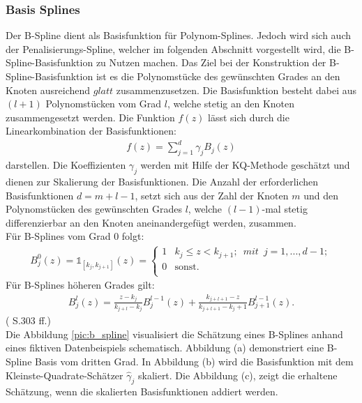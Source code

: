 \documentclass[12pt]{scrreprt}
\begin{document}
\subsubsection{Basis Splines}
Der B-Spline dient als Basisfunktion für Polynom-Splines. Jedoch wird sich auch der Penalisierungs-Spline, welcher im folgenden Abschnitt vorgestellt wird, die B-Spline-Basisfunktion zu Nutzen machen. Das Ziel bei der Konstruktion der B-Spline-Basisfunktion ist es die Polynomstücke des gewünschten Grades an den Knoten ausreichend $glatt$ zusammenzusetzen. Die Basisfunktion besteht dabei aus $(l+1)$ Polynomstücken vom Grad $l$, welche stetig an den Knoten zusammengesetzt werden. Die Funktion $f(z)$ lässt sich durch die Linearkombination der Basisfunktionen:
\begin{align}
f(z)=\sum_{j=1}^d\gamma_{j}B_{j}(z)
\end{align}
darstellen. Die Koeffizienten  $\gamma_{j}$ werden mit Hilfe der KQ-Methode geschätzt und dienen zur Skalierung der Basisfunktionen. Die Anzahl der erforderlichen Basisfunktionen $d = m+l-1$, setzt sich aus der Zahl der Knoten $m$ und den Polynomstücken des gewünschten Grades $l$, welche $(l-1)$-mal stetig differenzierbar an den Knoten aneinandergefügt werden, zusammen.  \\
Für B-Splines vom Grad 0 folgt:
\begin{align}
B_{j}^0(z)= \mathbb{1}_{[k_{j},k_{j+1}]}(z)= 
\begin{cases}
1 & k_{j} \leq z<k_{j+1};\enspace mit\enspace j=1,...,d-1; \\
0 & \text{sonst.} \\
\end{cases}
\end{align}
Für B-Splines höheren Grades gilt:
\begin{align}
B_{j}^l(z)= \frac{z-k_{j}}{k_{j+l}-k_{j}}B_{j}^{l-1}(z)+
\frac{k_{j+l+1}-z}{k_{j+l+1}-k_j+1}B_{j+1}^{l-1}(z).
\end{align}
(\cite{fahrmeir2007regression} S.303 ff.) \\
Die Abbildung \ref{pic:b_spline} visualisiert die Schätzung eines B-Splines anhand eines fiktiven Datenbeispiels schematisch. Abbildung (a) demonstriert eine B-Spline Basis vom dritten Grad. In Abbildung (b) wird die Basisfunktion mit dem Kleinste-Quadrate-Schätzer $\hat\gamma_{j}$ skaliert. Die Abbildung (c), zeigt die erhaltene Schätzung, wenn die skalierten Basisfunktionen addiert werden.
\end{document}
